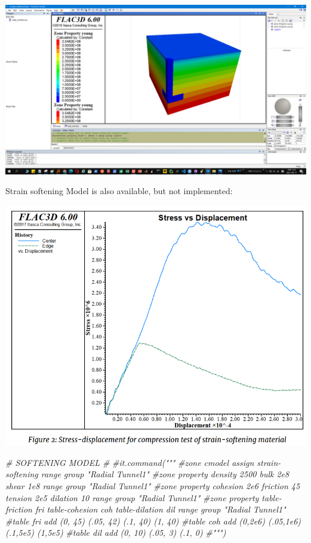 \documentclass[a4paper, nobind]{templates/ociamthesis}
\newenvironment{Shaded}{\begin{snugshade}}{\end{snugshade}}
\newcommand{\CommentTok}[1]{\textcolor[rgb]{0.56,0.35,0.01}{\textit{#1}}}
\renewenvironment{Shaded}
{
  \vspace{10pt}%
  \begin{snugshade}%
}{%
  \end{snugshade}%
  \vspace{8pt}%
}
\begin{document}
\includegraphics[width=1\linewidth]{myfigureeeeee/g}

Strain softening Model is also available, but not implemented:

\includegraphics[width=1\linewidth]{myfigureeeeee/softening}

\begin{Shaded}
\begin{Highlighting}[]
\CommentTok{\# SOFTENING MODEL \#}
\CommentTok{\#it.command("""}
\CommentTok{\#zone cmodel assign strain{-}softening range group "Radial Tunnel1"}
\CommentTok{\#zone property density 2500 bulk 2e8 shear 1e8 range group "Radial Tunnel1"}
\CommentTok{\#zone property cohesion 2e6 friction 45 tension 2e5 dilation 10 range group "Radial Tunnel1"}
\CommentTok{\#zone property table{-}friction \textquotesingle{}fri\textquotesingle{} table{-}cohesion \textquotesingle{}coh\textquotesingle{} table{-}dilation \textquotesingle{}dil\textquotesingle{} range group "Radial Tunnel1"}
\CommentTok{\#table \textquotesingle{}fri\textquotesingle{} add (0, 45) (.05, 42) (.1, 40) (1, 40)}
\CommentTok{\#table \textquotesingle{}coh\textquotesingle{} add (0,2e6) (.05,1e6) (.1,5e5) (1,5e5) }
\CommentTok{\#table \textquotesingle{}dil\textquotesingle{} add (0, 10) (.05,  3) (.1,  0)}
\CommentTok{\#""")}
\end{Highlighting}
\end{Shaded}
\end{document}
